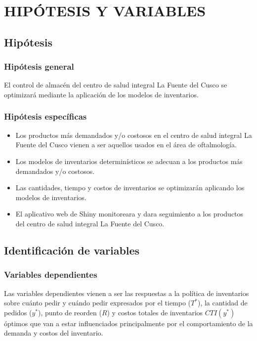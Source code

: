 \newpage
\chapter{HIPÓTESIS Y VARIABLES}
\section{Hipótesis}

\subsection{Hipótesis general}
El control de almacén del centro de salud integral La Fuente del Cusco se optimizará mediante la aplicación de los modelos de inventarios.

\subsection{Hipótesis específicas}

\begin{itemize}
\item Los productos más demandados y/o costosos en el centro de salud integral La Fuente del Cusco vienen a ser aquellos usados en el área de oftalmología.
\item Los modelos de inventarios determinísticos se adecuan a los productos más demandados y/o costosos.
\item Las cantidades, tiempo y costos de inventarios se optimizarán aplicando los modelos de inventarios.
\item El aplicativo web de Shiny monitoreara y dara seguimiento a los productos del centro de salud integral La Fuente del Cusco.
\end{itemize}

\section{Identificación de variables}
\subsection{Variables dependientes}
Las variables dependientes vienen a ser las respuestas a la política de inventarios sobre cuánto pedir y cuándo pedir expresados por el tiempo ($T^*$), la cantidad de pedidos ($y^*$), punto de reorden ($R$) y costos totales de inventarios $CTI(y^*)$ óptimos que van a estar influenciados principalmente por el comportamiento de la demanda y costos del inventario.
\clearpage
